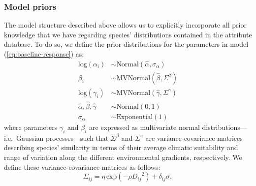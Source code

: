 \documentclass[11pt, a4paper]{article}
\begin{document}
\subsubsection*{Model priors}
The model structure described above allows us to explicitly incorporate all prior knowledge that we have regarding species' distributions contained in the attribute database. To do so, we define the prior distributions for the parameters in model (\ref{eq:baseline-response}) as:
\begin{equation} 
\begin{split}
\text{log}(\alpha_{i}) & \sim \text{Normal}\left(\hat{\alpha}, \sigma_{\alpha}\right)\\
\beta_{i}  & \sim \text{MVNormal}\left(\hat{\beta}, \Sigma^{\beta}\right)\\
\text{log}(\gamma_{i})  & \sim \text{MVNormal}\left(\hat{\gamma}, \Sigma^{\gamma}\right)\\
\hat{\alpha}, 
\hat{\beta}, 
\hat{\gamma}  & \sim \text{Normal}\left(0,1\right)\\
\sigma_{\alpha}  & \sim \text{Exponential}\left(1\right)
\end{split}
\label{eq:baseline-priors}
\end{equation} 
where parameters $\gamma_i$ and $\beta_i$ are expressed as multivariate normal distributions---i.e.~Gaussian processes---such that $\Sigma^{\beta}$ and $\Sigma^{\gamma}$ are variance-covariance matrices describing species' similarity in terms of their average climatic suitability and range of variation along the different environmental gradients, respectively. We define these variance-covariance matrices as follows:
\begin{equation} 
\Sigma_{ij} = \eta\,\text{exp}\left(-\rho {D_{ij}}^2\right) + \delta_{ij} \sigma ,
\label{eq:covariance-baseline}
\end{equation}
\end{document}
